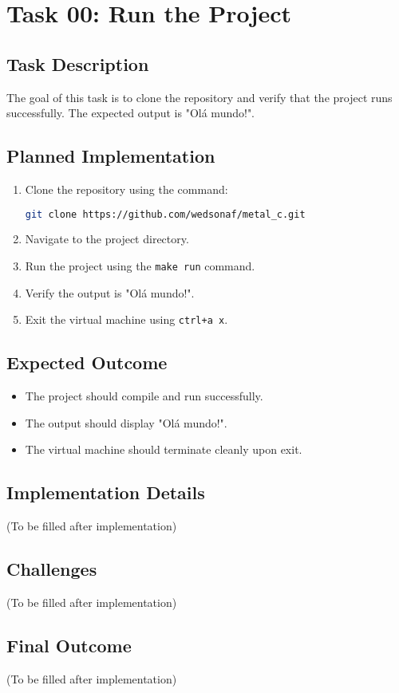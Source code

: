 \documentclass[a4paper,12pt]{report}
\begin{document}
\chapter{Task 00: Run the Project}

\section{Task Description}
The goal of this task is to clone the repository and verify that the project runs successfully. The expected output is "Olá mundo!".

\section{Planned Implementation}
\begin{enumerate}
    \item Clone the repository using the command:
    \begin{lstlisting}[language=bash]
    git clone https://github.com/wedsonaf/metal_c.git
    \end{lstlisting}
    \item Navigate to the project directory.
    \item Run the project using the \texttt{make run} command.
    \item Verify the output is "Olá mundo!".
    \item Exit the virtual machine using \texttt{ctrl+a x}.
\end{enumerate}

\section{Expected Outcome}
\begin{itemize}
    \item The project should compile and run successfully.
    \item The output should display "Olá mundo!".
    \item The virtual machine should terminate cleanly upon exit.
\end{itemize}

\section{Implementation Details}
(To be filled after implementation)

\section{Challenges}
(To be filled after implementation)

\section{Final Outcome}
(To be filled after implementation)
\end{document}
